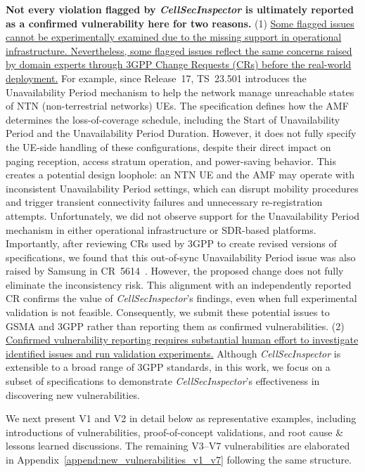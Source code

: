 \documentclass[sigconf]{acmart}
\newcommand{\lm}{\textit{CellSecInspector}\xspace}
\begin{document}
{\noindent 
\textbf{Not every violation flagged by \lm is ultimately reported as a confirmed vulnerability here for two reasons.}
(1) \ul{Some flagged issues cannot be experimentally examined due to the missing support in operational infrastructure. Nevertheless, some flagged issues reflect the same concerns raised by domain experts through 3GPP Change Requests (CRs) before the real-world deployment.}
For example, since Release~17, TS~23.501 introduces the Unavailability Period mechanism to help the network manage unreachable states of NTN (non-terrestrial networks) UEs. 
The specification defines how the AMF determines the loss-of-coverage schedule, including the Start of Unavailability Period and the Unavailability Period Duration. 
However, it does not fully specify the UE-side handling of these configurations, despite their direct impact on paging reception, access stratum operation, and power-saving behavior. 
This creates a potential design loophole: an NTN UE and the AMF may operate with inconsistent Unavailability Period settings, which can disrupt mobility procedures and trigger transient connectivity failures and unnecessary re-registration attempts. 
Unfortunately, we did not observe support for the Unavailability Period mechanism in either operational infrastructure or SDR-based platforms. 
Importantly, after reviewing CRs used by 3GPP to create revised versions of specifications, we found that this out-of-sync Unavailability Period issue was also raised by Samsung in CR~5614~\cite{netovate_cr_search}. 
However, the proposed change does not fully eliminate the inconsistency risk. 
This alignment with an independently reported CR confirms the value of \lm's findings, even when full experimental validation is not feasible. 
Consequently, we submit these potential issues to GSMA and 3GPP rather than reporting them as confirmed vulnerabilities. 
(2) \ul{Confirmed vulnerability reporting requires substantial human effort to investigate identified issues and run validation experiments.} 
Although \lm is extensible to a broad range of 3GPP standards, in this work, we focus on a subset of specifications to demonstrate \lm's effectiveness in discovering new vulnerabilities. 

We next present V1 and V2 in detail below as representative examples, including introductions of vulnerabilities, proof-of-concept validations, and root cause \& lessons learned discussions. The remaining V3--V7 vulnerabilities are elaborated in Appendix~\ref{append:new_vulnerabilities_v1_v7} following the same structure.




}
\end{document}
